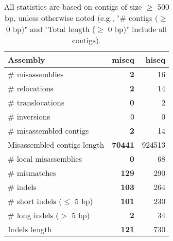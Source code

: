 \documentclass[12pt,a4paper]{article}
\begin{document}
\begin{table}[ht]
\begin{center}
\caption{All statistics are based on contigs of size $\geq$ 500 bp, unless otherwise noted (e.g., "\# contigs ($\geq$ 0 bp)" and "Total length ($\geq$ 0 bp)" include all contigs).}
\begin{tabular}{|l*{2}{|r}|}
\hline
Assembly & miseq & hiseq \\ \hline
\# misassemblies & {\bf 2} & 16 \\ \hline
\hspace{5mm}\# relocations & {\bf 2} & 14 \\ \hline
\hspace{5mm}\# translocations & {\bf 0} & 2 \\ \hline
\hspace{5mm}\# inversions & 0 & 0 \\ \hline
\# misassembled contigs & {\bf 2} & 14 \\ \hline
Misassembled contigs length & {\bf 70441} & 924513 \\ \hline
\# local misassemblies & {\bf 0} & 68 \\ \hline
\# mismatches & {\bf 129} & 290 \\ \hline
\# indels & {\bf 103} & 264 \\ \hline
\hspace{5mm}\# short indels ($\leq$ 5 bp) & {\bf 101} & 230 \\ \hline
\hspace{5mm}\# long indels ($>$ 5 bp) & {\bf 2} & 34 \\ \hline
Indels length & {\bf 121} & 730 \\ \hline
\end{tabular}
\end{center}
\end{table}
\end{document}
